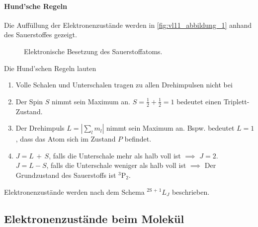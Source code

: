 \paragraph{Hund'sche Regeln} Die Auffüllung der Elektronenzustände werden in \autoref{fig:vl11_abbildung_1} anhand des Sauerstoffes gezeigt.
\begin{figure}[H]
    \centering
    \caption{Elektronische Besetzung des Sauerstoffatoms.}
    \label{fig:vl11_abbildung_1}
\end{figure}

Die Hund'schen Regeln lauten
\begin{enumerate}
	\item Volle Schalen und Unterschalen tragen zu allen Drehimpulsen nicht bei
	\item Der Spin $S$ nimmt sein Maximum an. $S = \frac{1}{2} + \frac{1}{2} = 1$ bedeutet einen {Triplett-Zustand}.
	\item Der Drehimpuls $L = \left| \sum_{l}^{} m_{l}  \right|$ nimmt sein Maximum an. Bspw. bedeutet $L=1$, dass das Atom sich im Zustand $P$ befindet. 
	\item $J= L\,+\,S$, falls die Unterschale mehr als halb voll ist $\implies$ $J=2$. \\
		  $J= L-S$, falls die Unterschale weniger als halb voll ist $\implies$ Der Grundzustand des Sauerstoffs ist $^3\text{P}_{2}$. 
\end{enumerate}
\begin{important}
	Elektronenzustände werden nach dem Schema $^{\text{2S + 1}} L_{J}$ beschrieben.
\end{important}

\subsection{Elektronenzustände beim Molekül}

